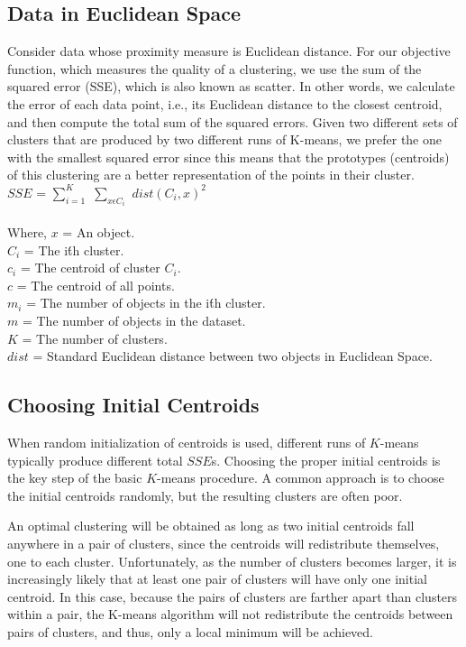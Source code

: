 \subsection{Data in Euclidean Space}
Consider data whose proximity measure is Euclidean distance.
For our objective function, which measures the quality of a
clustering, we use the sum of the squared error (SSE), which is also known
as scatter.  In other words, we calculate the error of each data point, i.e., its
Euclidean distance to the closest centroid, and then compute the total sum
of the squared errors.  Given two different sets of clusters that are produced
by two different runs of K-means, we prefer the one with the smallest squared
error since this means that the prototypes (centroids) of this clustering are
a better representation of the points in their cluster.\\

\hangindent=0.5cm
$SSE$ = $\sum_{i=1}^{K}$ $\sum_{x \epsilon C_i}$ $dist(C_i, x)^2$
\\\\Where,
$x$ = An object.\\
$C_i$ = The i\'th cluster.\\
$c_i$ = The centroid of cluster $C_i$.\\
$c$ = The centroid of all points.\\
$m_i$ = The number of objects in the i\'th cluster.\\
$m$ = The number of objects in the dataset.\\
$K$ = The number of clusters.\\
$dist$ = Standard Euclidean distance between two objects in Euclidean Space.\\

\subsection{Choosing Initial Centroids}
When random initialization of centroids is used, different runs of $K$-means
typically produce different total $SSE$s. Choosing the proper initial centroids
is the key step of the basic $K$-means procedure.  A common approach is to choose
the initial centroids randomly, but the resulting clusters are often poor.

An optimal clustering will be obtained as long as two initial
centroids fall anywhere in a pair of clusters, since the centroids will redistribute
themselves,  one to each cluster. Unfortunately,  as the number of clusters
becomes larger, it is increasingly likely that at least one pair of clusters will
have only one initial centroid. In this case,
because the pairs of clusters are farther apart than clusters within a pair, the
K-means algorithm will not redistribute the centroids between pairs of clusters,
and thus, only a local minimum will be achieved.

